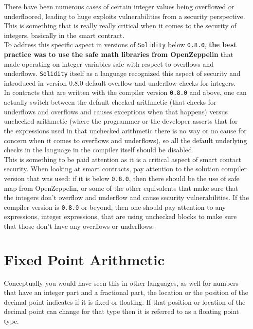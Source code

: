 There have been numerous cases of certain integer values being overflowed or underfloored, leading to huge exploits vulnerabilities from a security perspective. This is something that is really really critical when it comes to the security of integers, basically in the smart contract.\\ 

To address this specific aspect in versions of \texttt{Solidity} below \texttt{0.8.0}, \textbf{the best practice was to use the safe math libraries from OpenZeppelin} that made operating on integer variables safe with respect to overflows and underflows. \texttt{Solidity} itself as a language recognized this aspect of security and introduced in version 0.8.0 default overflow and underflow checks for integers.\\

In contracts that are written with the compiler version \texttt{0.8.0} and above, one can actually switch between the default checked arithmetic (that checks for underflows and overflows and causes exceptions when that happens) versus unchecked arithmetic (where the programmer or the developer asserts that for the expressions used in that unchecked arithmetic there is no way or no cause for concern when it comes to overflows and underflows), so all the default underlying checks in the language in the compiler itself should be disabled.\\

This is something to be paid attention as it is a critical aspect of smart contact security. When looking at smart contracts, pay attention to the solution compiler version that was used: if it is below \texttt{0.8.0}, then there should be the use of safe map from OpenZeppelin, or some of the other equivalents that make sure that the integers don't overflow and underflow and cause security vulnerabilities. If the compiler version is \texttt{0.8.0} or beyond, then one should pay attention to any expressions, integer expressions, that are using unchecked blocks to make sure that those don't have any overflows or underflows.

\section{Fixed Point Arithmetic}
Conceptually you would have seen this in other languages, as well for numbers that have an integer part and a fractional part, the location or the position of the decimal point indicates if it is fixed or floating. If that position or location of the decimal point can change for that type then it is referred to as a floating point type.\\

